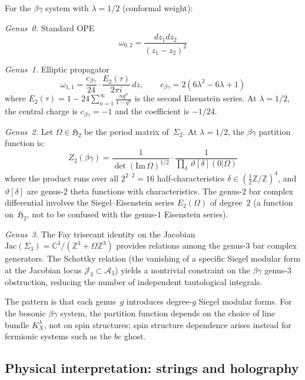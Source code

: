 \begin{example}
For the $\beta\gamma$ system with $\lambda = 1/2$ (conformal weight):

\emph{Genus~0.} Standard OPE
\[\omega_{0,2} = \frac{dz_1 dz_2}{(z_1 - z_2)^2}\]

\emph{Genus~1.} Elliptic propagator
\[\omega_{1,1} = \frac{c_{\beta\gamma}}{24} \cdot \frac{E_2(\tau)}{2\pi i}\, dz, \qquad c_{\beta\gamma} = 2(6\lambda^2 - 6\lambda + 1)\]
where $E_2(\tau) = 1 - 24\sum_{n=1}^\infty \frac{nq^n}{1-q^n}$ is the second Eisenstein series.  At $\lambda = 1/2$, the central charge is $c_{\beta\gamma} = -1$ and the coefficient is $-1/24$.

\emph{Genus~2.} Let $\Omega \in \mathfrak{H}_2$ be the period matrix of~$\Sigma_2$.  At $\lambda = 1/2$, the $\beta\gamma$ partition function is:
\[Z_2(\beta\gamma) = \frac{1}{\det(\mathrm{Im}\,\Omega)^{1/2}} \cdot \frac{1}{\prod_\delta\, \vartheta[\delta](0|\Omega)}\]
where the product runs over all $2^{2 \cdot 2} = 16$ half-characteristics $\delta \in (\tfrac{1}{2}\mathbb{Z}/\mathbb{Z})^4$, and $\vartheta[\delta]$ are genus-$2$ theta functions with characteristics.  The genus-$2$ bar complex differential involves the Siegel--Eisenstein series $E_2(\Omega)$ of degree~$2$ (a function on~$\mathfrak{H}_2$, not to be confused with the genus-$1$ Eisenstein series).

\emph{Genus~3.}  The Fay trisecant identity on the Jacobian $\mathrm{Jac}(\Sigma_3) = \mathbb{C}^3/(\mathbb{Z}^3 + \Omega\mathbb{Z}^3)$ provides relations among the genus-$3$ bar complex generators.  The Schottky relation (the vanishing of a specific Siegel modular form at the Jacobian locus $\mathcal{J}_3 \subset \mathcal{A}_3$) yields a nontrivial constraint on the $\beta\gamma$ genus-$3$ obstruction, reducing the number of independent tautological integrals.

The pattern is that each genus~$g$ introduces degree-$g$ Siegel modular forms.  For the bosonic $\beta\gamma$ system, the partition function depends on the choice of line bundle $K_X^\lambda$, not on spin structures; spin structure dependence arises instead for fermionic systems such as the $bc$ ghost.
\end{example}


\subsection{Physical interpretation: strings and holography}\label{subsec:physics}

